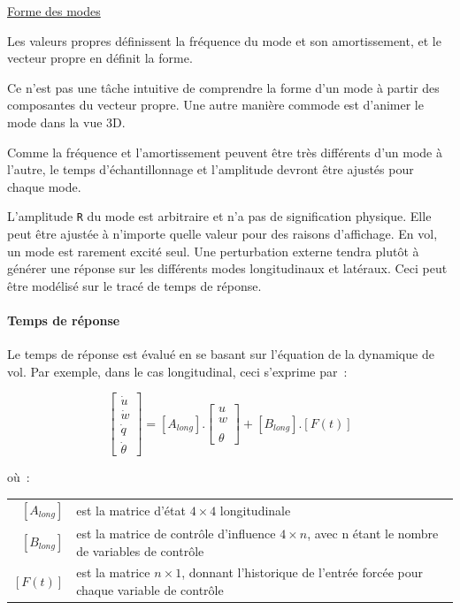 \documentclass[a4paper,twoside,12pt,dvips]{article}
\begin{document}
\underline{Forme des modes}

Les valeurs propres définissent la fréquence du mode et son amortissement, et le
vecteur propre en définit la forme.

Ce n’est pas une tâche intuitive de comprendre la forme d’un mode à partir des
composantes du vecteur propre. Une autre manière commode est d’animer le mode dans la vue 3D.

Comme la fréquence et l’amortissement peuvent être très différents d’un mode à l’autre, le temps d’échantillonnage et l’amplitude devront être ajustés pour chaque mode.

L’amplitude \texttt{R} du mode est arbitraire et n’a pas de signification	 physique. Elle peut être ajustée à n’importe quelle valeur pour des raisons d’affichage. En vol, un mode est rarement excité seul. Une perturbation externe tendra plutôt à générer une réponse sur les différents modes longitudinaux et latéraux. Ceci peut être modélisé sur le tracé de temps de réponse.

\paragraph{Temps de réponse}

Le temps de réponse est évalué en se basant sur l’équation de la dynamique
de vol. Par exemple, dans le cas longitudinal, ceci s’exprime par~:

$$\left[\begin{matrix} \dot{u} \\ \dot{w} \\ \dot{q} \\ \dot{\theta} \end{matrix}\right] = \left[A_{long}\right] . \left[\begin{matrix} u \\ w \\  \\ \theta \end{matrix}\right] + \left[B_{long}\right] . \left[F(t)\right]$$

où~:

\begin{tabular}{rl}
  $\left[A_{long}\right]$ & est la matrice d’état $4\times 4$ longitudinale\\
  $\left[B_{long}\right]$ & est la matrice de contrôle d’influence $4 \times n$,
  avec n étant le nombre de variables de contrôle\\
  $\left[F(t)\right]$ & est la matrice $n\times 1$, donnant l’historique de 
  l’entrée forcée pour chaque variable de contrôle
\end{tabular}
\end{document}
